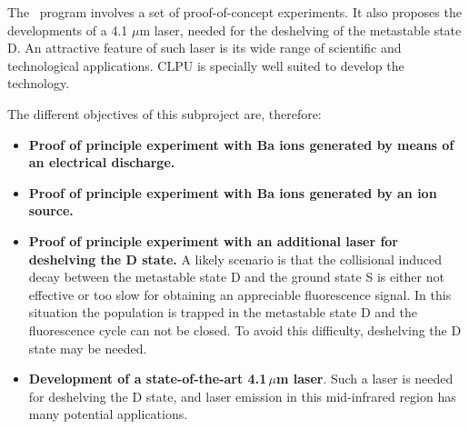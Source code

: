 The \BATA\ program involves a set of proof-of-concept experiments. It also proposes the developments of a 4.1 $\mu$m laser, needed for the deshelving of the metastable state D. An attractive feature of such laser is its wide range of scientific and technological applications. CLPU is specially well suited to develop the technology.

The different objectives of this subproject are, therefore:

\begin{itemize}
	\item \textbf{Proof of principle experiment with Ba ions generated by means of an electrical discharge.}
	
	\item \textbf{Proof of principle experiment with Ba ions generated by an ion source.}	
	
%	
	\item \textbf{Proof of principle experiment with an additional laser for deshelving the D state.} A likely scenario is that the collisional induced decay between the metastable state D and the ground state S is either not effective or too slow for obtaining an appreciable fluorescence signal. In this situation the population is trapped in the metastable state D and the fluorescence cycle can not be closed. To avoid this difficulty, deshelving the D state may be needed.

\item \textbf{Development of a state-of-the-art 4.1\,$\mu$m laser}. Such a laser is needed for deshelving the D state, and laser emission in this mid-infrared region has many potential applications.

\end{itemize}

